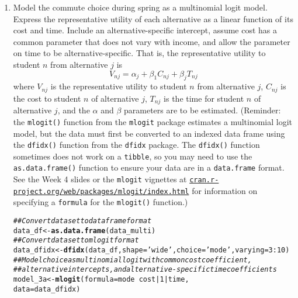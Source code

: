 \documentclass[11pt,letterpaper]{article}\usepackage[]{graphicx}\usepackage[]{color}
\makeatletter
\newcommand{\hlnum}[1]{\textcolor[rgb]{0.686,0.059,0.569}{#1}}%
\newcommand{\hlstr}[1]{\textcolor[rgb]{0.192,0.494,0.8}{#1}}%
\newcommand{\hlcom}[1]{\textcolor[rgb]{0.678,0.584,0.686}{\textit{#1}}}%
\newcommand{\hlopt}[1]{\textcolor[rgb]{0,0,0}{#1}}%
\newcommand{\hlstd}[1]{\textcolor[rgb]{0.345,0.345,0.345}{#1}}%
\newcommand{\hlkwb}[1]{\textcolor[rgb]{0.69,0.353,0.396}{#1}}%
\newcommand{\hlkwc}[1]{\textcolor[rgb]{0.333,0.667,0.333}{#1}}%
\newcommand{\hlkwd}[1]{\textcolor[rgb]{0.737,0.353,0.396}{\textbf{#1}}}%
\newenvironment{kframe}{%
 \def\at@end@of@kframe{}%
 \ifinner\ifhmode%
  \def\at@end@of@kframe{\end{minipage}}%
  \begin{minipage}{\columnwidth}%
 \fi\fi%
 \def\FrameCommand##1{\hskip\@totalleftmargin \hskip-\fboxsep
 \colorbox{shadecolor}{##1}\hskip-\fboxsep
     \hskip-\linewidth \hskip-\@totalleftmargin \hskip\columnwidth}%
 \MakeFramed {\advance\hsize-\width
   \@totalleftmargin\z@ \linewidth\hsize
   \@setminipage}}%
 {\par\unskip\endMakeFramed%
 \at@end@of@kframe}
\newenvironment{knitrout}{}{} %
\makeatother
\begin{document}
\begin{enumerate}[label=\alph*., leftmargin=*]
	\item Model the commute choice during spring as a multinomial logit model. Express the representative utility of each alternative as a linear function of its cost and time. Include an alternative-specific intercept, assume cost has a common parameter that does not vary with income, and allow the parameter on time to be alternative-specific. That is, the representative utility to student $n$ from alternative $j$ is
$$V_{nj} = \alpha_j + \beta_1 C_{nj} + \beta_j T_{nj}$$
where $V_{nj}$ is the representative utility to student $n$ from alternative $j$, $C_{nj}$ is the cost to student $n$ of alternative $j$, $T_{nj}$ is the time for student $n$ of alternative $j$, and the $\alpha$ and $\beta$ parameters are to be estimated. (Reminder: the \texttt{mlogit()} function from the \texttt{mlogit} package estimates a multinomial logit model, but the data must first be converted to an indexed data frame using the \texttt{dfidx()} function from the \texttt{dfidx} package. The \texttt{dfidx()} function sometimes does not work on a \texttt{tibble}, so you may need to use the \texttt{as.data.frame()} function to ensure your data are in a \texttt{data.frame} format. See the Week 4 slides or the \texttt{mlogit} vignettes at \href{https://cran.r-project.org/web/packages/mlogit/index.html}{\texttt{cran.r-project.org/web/packages/mlogit/index.html}} for information on specifying a \texttt{formula} for the \texttt{mlogit()} function.)

\begin{knitrout}
\color{fgcolor}\begin{kframe}
\begin{alltt}
\hlcom{## Convert dataset to data frame format}
\hlstd{data_df} \hlkwb{<-} \hlkwd{as.data.frame}\hlstd{(data_multi)}
\hlcom{## Convert dataset to mlogit format}
\hlstd{data_dfidx} \hlkwb{<-} \hlkwd{dfidx}\hlstd{(data_df,} \hlkwc{shape} \hlstd{=} \hlstr{'wide'}\hlstd{,} \hlkwc{choice} \hlstd{=} \hlstr{'mode'}\hlstd{,} \hlkwc{varying} \hlstd{=} \hlnum{3}\hlopt{:}\hlnum{10}\hlstd{)}
\hlcom{## Model choice as multinomial logit with common cost coefficient, }
\hlcom{## alternative intercepts, and alternative-specific time coefficients}
\hlstd{model_3a} \hlkwb{<-} \hlkwd{mlogit}\hlstd{(}\hlkwc{formula} \hlstd{= mode} \hlopt{~} \hlstd{cost} \hlopt{|} \hlnum{1} \hlopt{|} \hlstd{time,}
                   \hlkwc{data} \hlstd{= data_dfidx)}
\end{alltt}
\end{kframe}
\end{knitrout}


\end{enumerate}
\end{document}
